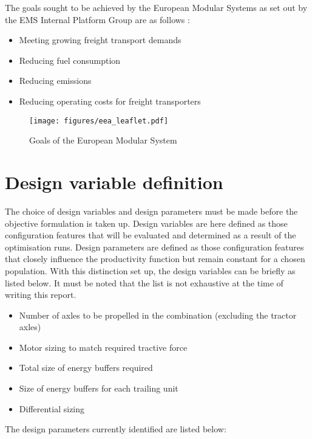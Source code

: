 \documentclass[ExampleMasters.tex]{subfiles}
\begin{document}
	The goals sought to be achieved by the European Modular Systems as set out by the EMS Internal Platform Group are as follows \cite{EMSleaflet}:
	\begin{itemize}
		\item Meeting growing freight transport demands
		\item Reducing fuel consumption
		\item Reducing emissions
		\item Reducing operating costs for freight transporters
	\end{itemize}

	\begin{figure}[h!]
		\centering
		\texttt{[image: figures/eea\_leaflet.pdf]}
		\caption{Goals of the European Modular System \cite{EMSleaflet}}
		\label{EMSleaflet}
	\end{figure}

	\section{Design variable definition}
		The choice of design variables and design parameters must be made before the objective formulation is taken up. Design variables are here defined as those configuration features that will be evaluated and determined as a result of the optimisation runs. Design parameters are defined as those configuration features that closely influence the productivity function but remain constant for a chosen population. With this distinction set up, the design variables can be briefly as listed below. It must be noted that the list is not exhaustive at the time of writing this report.

		\begin{itemize}
		\item Number of axles to be propelled in the combination (excluding the tractor axles)
		\item Motor sizing to match required tractive force
		\item Total size of energy buffers required
		\item Size of energy buffers for each trailing unit
		\item Differential sizing
		\end{itemize}

		The design parameters currently identified are listed below:
\end{document}
